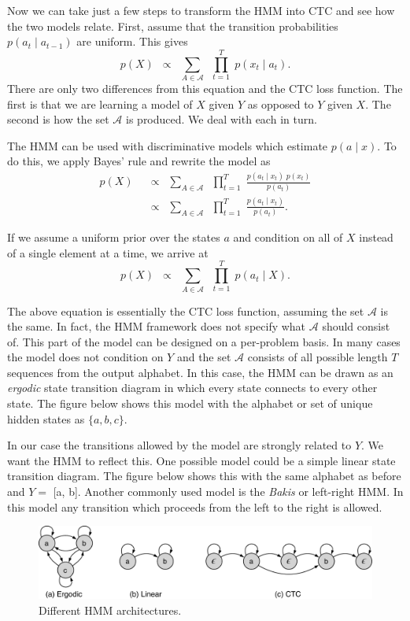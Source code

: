 Now we can take just a few steps to transform the HMM into CTC and see how
the two models relate. First, assume that the transition probabilities
$p(a_t \mid a_{t-1})$ are uniform. This gives
\[
p(X) \enspace \propto \enspace \sum_{A \in \mathcal{A}} \enspace \prod_{t=1}^T \; p(x_t \mid a_t).
\]
There are only two differences from this equation and the CTC loss function.
The first is that we are learning a model of $X$ given $Y$ as opposed to $Y$
given $X$. The second is how the set $\mathcal{A}$ is produced. We deal with
each in turn.

The HMM can be used with discriminative models which estimate $p(a \mid x)$.
To do this, we apply Bayes’ rule and rewrite the model as
\begin{align*}
p(X) \enspace &\propto \enspace \sum_{A \in \mathcal{A}} \enspace \prod_{t=1}^T \; \frac{p(a_t \mid x_t)\; p(x_t)}{p(a_t)} \\
    &\propto \enspace \sum_{A \in \mathcal{A}} \enspace \prod_{t=1}^T \; \frac{p(a_t \mid x_t)}{p(a_t)}.
\end{align*}

If we assume a uniform prior over the states $a$ and condition on all of $X$
instead of a single element at a time, we arrive at
\[
p(X) \enspace \propto \enspace \sum_{A \in \mathcal{A}} \enspace \prod_{t=1}^T \; p(a_t \mid X).
\]

The above equation is essentially the CTC loss function, assuming the set
$\mathcal{A}$ is the same. In fact, the HMM framework does not specify what
$\mathcal{A}$ should consist of. This part of the model can be designed on a
per-problem basis. In many cases the model does not condition on $Y$ and the
set $\mathcal{A}$ consists of all possible length $T$ sequences from the output
alphabet. In this case, the HMM can be drawn as an  {\it ergodic} state
transition diagram in which every state connects to every other state. The
figure below shows this model with the alphabet or set of unique hidden states
as $\{a, b, c\}$.

In our case the transitions allowed by the model are strongly related to $Y$.
We want the HMM to reflect this. One possible model could be a simple linear
state transition diagram. The figure below shows this with the same alphabet as
before and $Y =$ [a, b]. Another commonly used model is the {\it Bakis} or
left-right HMM. In this model any transition which proceeds from the left to
the right is allowed.

\begin{figure}
    \centering
    \includegraphics[width=\textwidth]{background/figures/hmm_types.pdf}
    \caption{Different HMM architectures.}
\end{figure}

